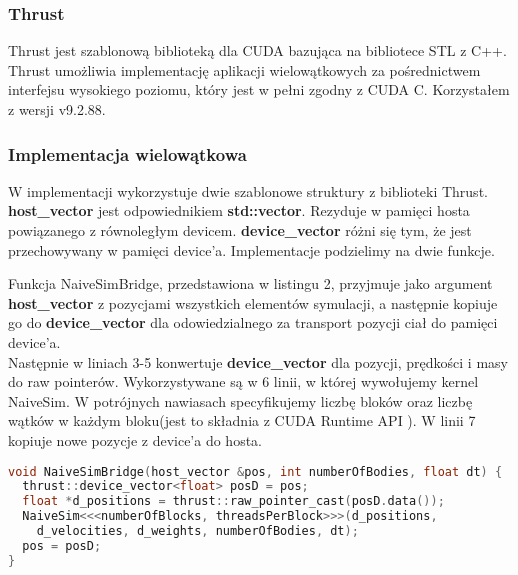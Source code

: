 \documentclass[14pt,twoside,a4paper]{article}
\theoremstyle{definition}
\begin{document}
\subsubsection{\large Thrust}
Thrust jest szablonową biblioteką dla CUDA bazująca na bibliotece STL z C++. Thrust umożliwia implementację aplikacji wielowątkowych za pośrednictwem interfejsu wysokiego poziomu, który jest w pełni zgodny z CUDA C. Korzystałem z wersji v9.2.88. \cite{thrust}


\subsubsection{\large Implementacja wielowątkowa}
W implementacji wykorzystuje dwie szablonowe struktury z biblioteki Thrust.
\textbf{host\_vector}\cite{thrust} jest odpowiednikiem \textbf{std::vector}. Rezyduje w pamięci hosta powiązanego z równoległym devicem. \textbf{device\_vector}\cite{thrust} różni się tym, że jest przechowywany w pamięci device'a. Implementacje podzielimy na dwie funkcje.\\
\bigskip

Funkcja NaiveSimBridge, przedstawiona w listingu 2, przyjmuje jako argument \textbf{host\_vector} z pozycjami wszystkich elementów symulacji, a następnie kopiuje go do \textbf{device\_vector} dla odowiedzialnego za transport pozycji ciał do pamięci device'a. \\Następnie w liniach 3-5 konwertuje \textbf{device\_vector} dla pozycji, prędkości i masy do raw pointerów. Wykorzystywane są w 6 linii, w której wywołujemy kernel NaiveSim. W potrójnych nawiasach specyfikujemy liczbę bloków oraz liczbę wątków w każdym bloku(jest to składnia z CUDA Runtime API \cite{runtimeApi}). 
W linii 7 kopiuje nowe pozycje z device'a do hosta. 
\bigskip
\bigskip
\bigskip

\begin{lstlisting}[language=C++, frame=single, framerule=2pt, caption=Bridge pomiędzy główną pętlą a kernelem]
void NaiveSimBridge(host_vector &pos, int numberOfBodies, float dt) {
  thrust::device_vector<float> posD = pos;
  float *d_positions = thrust::raw_pointer_cast(posD.data());
  NaiveSim<<<numberOfBlocks, threadsPerBlock>>>(d_positions, 
  	d_velocities, d_weights, numberOfBodies, dt);
  pos = posD;
}
\end{lstlisting}
\end{document}
